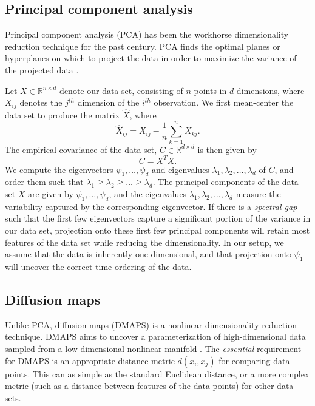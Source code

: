 \documentclass[10pt]{article}
\begin{document}
\subsection*{Principal component analysis}
Principal component analysis (PCA) has been the workhorse dimensionality reduction technique for the past century.
%
PCA finds the optimal planes or hyperplanes on which to project the data in order to maximize the variance of the projected data \cite{shlens2005tutorial}.

Let $X \in \mathbb{R}^{n \times d}$ denote our data set, consisting of $n$ points in $d$ dimensions, where $X_{ij}$ denotes the $j^{th}$ dimension of the $i^{th}$ observation. 
%
We first mean-center the data set to produce the matrix $\hat{X}$, where
\begin{equation}
\hat{X}_{ij} = X_{ij} - \frac{1}{n} \sum_{k=1}^n X_{kj}.
\end{equation}
%
The empirical covariance of the data set, $C \in \mathbb{R}^{d \times d}$ is then given by
\begin{equation}
C = X^T X.
\end{equation}
%
We compute the eigenvectors $\psi_1, \dots, \psi_d$ and eigenvalues $\lambda_1, \lambda_2, \dots, \lambda_d$ of $C$, and order them such that $\lambda_1 \ge \lambda_2 \ge \dots \ge \lambda_d$.
%
The principal components of the data set $X$ are given by $\psi_1, \dots, \psi_d$, and the eigenvalues $\lambda_1, \lambda_2, \dots, \lambda_d$ measure the variability captured by the corresponding eigenvector. 
%
If there is a {\em spectral gap} such that the first few eigenvectors capture a significant portion of the variance in our data set, projection onto these first few principal components will retain most features of the data set while reducing the dimensionality.
%
In our setup, we assume that the data is inherently one-dimensional, and that projection onto $\psi_1$ will uncover the correct time ordering of the data.

\subsection*{Diffusion maps}
Unlike PCA, diffusion maps (DMAPS) is a nonlinear dimensionality reduction technique. 
%
DMAPS aims to uncover a parameterization of high-dimensional data sampled from a low-dimensional nonlinear manifold \cite{coifman2005geometric}.
%
The {\em essential} requirement for DMAPS is an appropriate distance metric $d(x_i, x_j)$ for comparing data points. 
%
This can as simple as the standard Euclidean distance, or a more complex metric (such as a distance between features of the data points) for other data sets.
\end{document}
